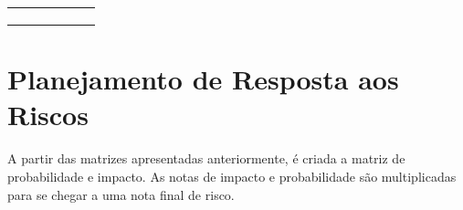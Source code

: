 \begin{table}[H]
\begin{tabular}{|c|c|c|c|c|c|}
                                          &                                                                                                                 &                                                                                           &                                                                                                      &                                                                                                                 &                                                                                                  \\ 
                                          &                                                                                                                 &                                                                                           &                                                                                                      &                                                                                                                 &      \\ 
                                          &                                                                                                                 &                                                                                           &                                                                                                      &                                                                                                                 &      \\ \hline
\end{tabular}
\end{table}

 \section{Planejamento de Resposta aos Riscos} %
 \label{sec:planejamento_de_resposta_aos_riscos}
 	
 	A partir das matrizes apresentadas anteriormente, é criada a matriz de probabilidade e impacto. As notas de impacto e probabilidade são multiplicadas para se chegar a uma nota final de risco.


